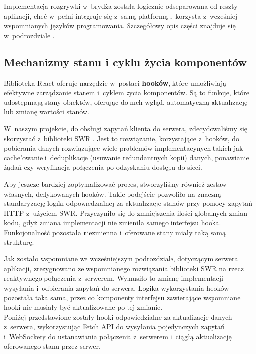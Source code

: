 Implementacja rozgrywki w~brydża została logicznie
odseparowana od reszty aplikacji, choć w~pełni integruje się z~samą
platformą i~korzysta z~wcześniej wspomnianych języków programowania.
Szczegółowy opis części znajduje się w~podrozdziale .

\subsection{Mechanizmy stanu i cyklu życia komponentów}
Biblioteka React oferuje narzędzie w~postaci \textbf{hooków},
które umożliwiają efektywne zarządzanie stanem i~cyklem życia komponentów.
Są to funkcje, które udostępniają stany obiektów, oferując do nich wgląd, automatyczną aktualizację
lub zmianę wartości stanów.

W~naszym projekcie, do obsługi zapytań klienta do serwera, zdecydowaliśmy się
skorzystać z~biblioteki SWR \cite{SWR}.
Jest to rozwiązanie, korzystające z~hooków, do
pobierania danych rozwiązujące wiele problemów implementacynych takich jak
cache'owanie i~deduplikacje (usuwanie redundantnych kopii) danych, ponawianie żądań
czy weryfikacja połączenia po odzyskaniu dostępu do sieci.

Aby jeszcze bardziej zoptymalizować proces, stworzyliśmy
również zestaw własnych, dedykowanych hooków. Takie podejście pozwoliło na
znaczną standaryzację logiki odpowiedzialnej za aktualizacje stanów przy pomocy
zapytań HTTP z~użyciem SWR. Przyczyniło się do zmniejszenia ilości
globalnych zmian kodu, gdyż zmiana implementacji nie zmieniła samego interfejsu
hooka. Funkcjonalność pozostała niezmienna i~oferowane stany miały taką samą strukturę.

Jak zostało wspomniane we wcześniejszym podrozdziale, dotyczącym serwera aplikacji,
zrezygnowano ze wspomnianego rozwiązania biblioteki SWR na rzecz reaktywnego
połączenia z~serwerem. Wymusiło to zmianę implementacji wysyłania i~odbierania
zapytań do serwera. Logika
wykorzystania hooków pozostała taka sama, przez co komponenty interfejsu
zawierające wspomniane hooki nie musiały być aktualizowane po tej zmianie. \\

Poniżej przedstawione zostały hooki odpowiedzialne za aktualizacje
danych z~serwera, wykorzystując Fetch API \cite{FetchAPI} do wysyłania pojedynczych
zapytań i~WebSockety \cite{WebSockets} do ustanawiania połączenia z~serwerem
i~ciągłą aktualizację oferowanego stanu przez serwer.

